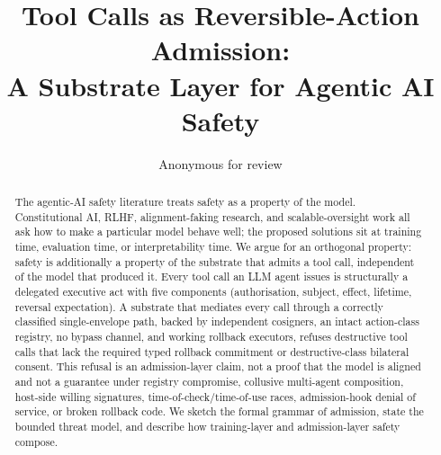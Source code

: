 \documentclass[11pt]{article}
\title{Tool Calls as Reversible-Action Admission:\\
A Substrate Layer for Agentic AI Safety}
\author{Anonymous for review}
\date{}
\begin{document}
\maketitle

\begin{abstract}
The agentic-AI safety literature treats safety as a property of the model. Constitutional AI, RLHF, alignment-faking research, and scalable-oversight work all ask how to make a particular model behave well; the proposed solutions sit at training time, evaluation time, or interpretability time. We argue for an orthogonal property: safety is additionally a property of the substrate that admits a tool call, independent of the model that produced it. Every tool call an LLM agent issues is structurally a delegated executive act with five components (authorisation, subject, effect, lifetime, reversal expectation). A substrate that mediates every call through a correctly classified single-envelope path, backed by independent cosigners, an intact action-class registry, no bypass channel, and working rollback executors, refuses destructive tool calls that lack the required typed rollback commitment or destructive-class bilateral consent. This refusal is an admission-layer claim, not a proof that the model is aligned and not a guarantee under registry compromise, collusive multi-agent composition, host-side willing signatures, time-of-check/time-of-use races, admission-hook denial of service, or broken rollback code. We sketch the formal grammar of admission, state the bounded threat model, and describe how training-layer and admission-layer safety compose.
\end{abstract}













\end{document}
